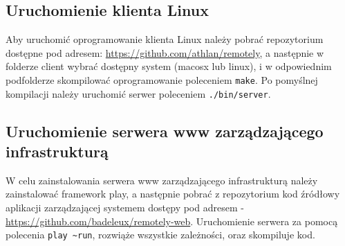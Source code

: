 \subsection{Uruchomienie klienta Linux}

Aby uruchomić oprogramowanie klienta Linux należy pobrać repozytorium dostępne pod adresem: \url{https://github.com/athlan/remotely}, a następnie w folderze client wybrać dostępny system (macosx lub linux), i w odpowiednim podfolderze skompilować oprogramowanie poleceniem \lstinline{make}.
Po pomyślnej kompilacji należy uruchomić serwer poleceniem \lstinline{./bin/server}.


\subsection{Uruchomienie serwera www zarządzającego infrastrukturą}

W celu zainstalowania serwera www zarządzającego infrastrukturą należy zainstalować framework play, a następnie pobrać z repozytorium kod źródłowy aplikacji zarządzającej systemem dostępy pod adresem - \url{https://github.com/badeleux/remotely-web}. Uruchomienie serwera za pomocą polecenia \lstinline|play ~run|, rozwiąże wszystkie zależności, oraz skompiluje kod. 


